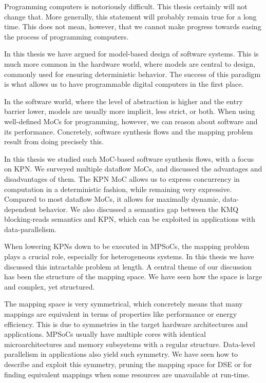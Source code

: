 Programming computers is notoriously difficult.
This thesis certainly will not change that.
More generally, this statement will probably remain true for a long time.
This does not mean, however, that we cannot make progress towards easing the process of programming computers.

In this thesis we have argued for model-based design of software systems.
This is much more common in the hardware world, where models are central to design, commonly used for ensuring deterministic behavior.
The success of this paradigm is what allows us to have programmable digital computers in the first place.

In the software world, where the level of abstraction is higher and the entry barrier lower, models are usually more implicit, less strict, or both.
When using well-defined \acfp{MoC} for programming, however, we can reason about software and its performance.
Concretely, software synthesis flows and the mapping problem result from doing precisely this.

In this thesis we studied such \ac{MoC}-based software synthesis flows, with a focus on \acf{KPN}.
We surveyed multiple dataflow \acp{MoC}, and discussed the advantages and disadvantages of them. 
The \ac{KPN} \ac{MoC} allows us to express concurrency in computation in a deterministic fashion, while remaining very expressive.
Compared to most dataflow \acp{MoC}, it allows for maximally dynamic, data-dependent behavior.
We also discussed a semantics gap between the \acf{KMQ} blocking-reads semantics and \ac{KPN}, which can be exploited in applications with data-parallelism.

When lowering \acp{KPN} down to be executed in \acp{MPSoC}, the mapping problem plays a crucial role, especially for heterogeneous systems.
In this thesis we have discussed this intractable problem at length.
A central theme of our discussion has been the structure of the mapping space.
We have seen how the space is large and complex, yet structured.

The mapping space is very symmetrical, which concretely means that many mappings are equivalent in terms of properties like performance or energy efficiency.
This is due to symmetries in the target hardware architectures and applications.
\acp{MPSoC} usually have multiple cores with identical microarchitectures and memory subsystems with a regular structure.
Data-level parallelism in applications also yield such symmetry.
We have seen how to describe and exploit this symmetry, pruning the mapping space for \acf{DSE} or for finding equivalent mappings when some resources are unavailable at run-time.

